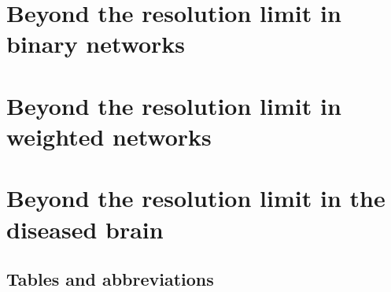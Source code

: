 \chapter{Beyond the resolution limit in binary networks}\label{chap:beyondresolutionlimitbinarynetworks}


\chapter{Beyond the resolution limit in weighted networks}
\label{chap:beyondresolutionlimitweightednetworks}


\chapter{Beyond the resolution limit in the diseased brain}






\begin{appendices}
\chapter{Tables and abbreviations}


%
\end{appendices}


